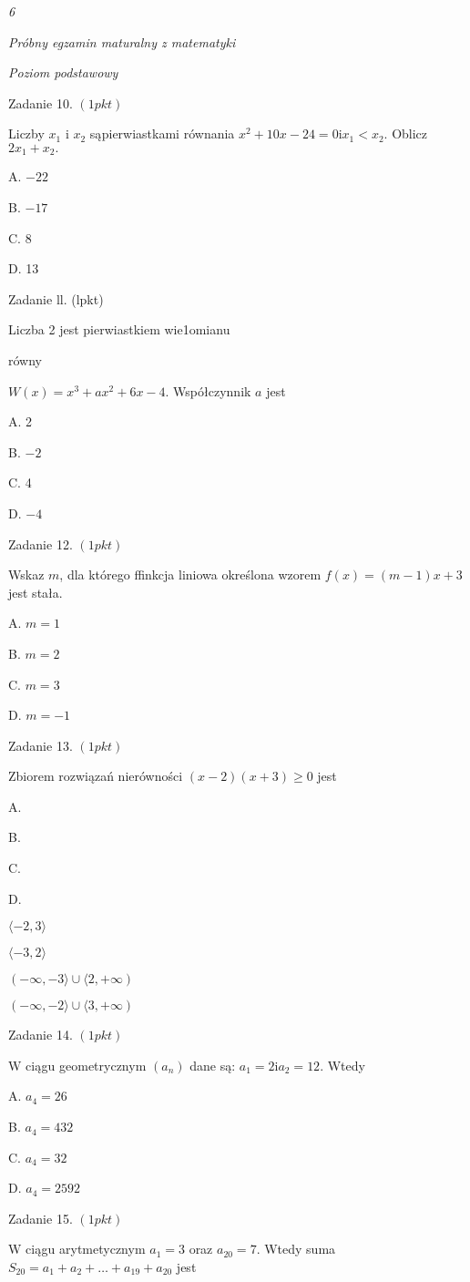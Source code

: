\documentclass[a4paper,12pt]{article}
\begin{document}
{\it 6}

{\it Próbny egzamin maturalny z matematyki}

{\it Poziom podstawowy}

Zadanie 10. $(1pkt)$

Liczby $x_{1}$ i $x_{2}$ sąpierwiastkami równania $x^{2}+10x-24=0\mathrm{i}x_{1}<x_{2}$. Oblicz $2x_{1}+x_{2}.$

A. $-22$

B. $-17$

C. 8

D. 13

Zadanie ll. (lpkt)

Liczba 2 jest pierwiastkiem wie1omianu

równy

$W(x)=x^{3}+ax^{2}+6x-4$. Współczynnik $a$ jest

A. 2

B. $-2$

C. 4

D. $-4$

Zadanie 12. $(1pkt)$

Wskaz $m$, dla którego ffinkcja liniowa określona wzorem $f(x)=(m-1)x+3$ jest stała.

A. $m=1$

B. $m=2$

C. $m=3$

D. $m=-1$

Zadanie 13. $(1pkt)$

Zbiorem rozwiązań nierówności $(x-2)(x+3)\geq 0$ jest

A.

B.

C.

D.

$\langle-2,3\rangle$

$\langle-3,2\rangle$

$(-\infty,-3\rangle\cup\langle 2,+\infty)$

$(-\infty,-2\rangle\cup\langle 3,+\infty)$

Zadanie 14. $(1pkt)$

$\mathrm{W}$ ciągu geometrycznym $(a_{n})$ dane są: $a_{1}=2\mathrm{i}a_{2}=12$. Wtedy

A. $a_{4}=26$

B. $a_{4}=432$

C. $a_{4}=32$

D. $a_{4}=2592$

Zadanie 15. $(1pkt)$

$\mathrm{W}$ ciągu arytmetycznym $a_{1}=3$ oraz $a_{20}=7$. Wtedy suma $S_{20}=a_{1}+a_{2}+\ldots+a_{19}+a_{20}$ jest
\end{document}
